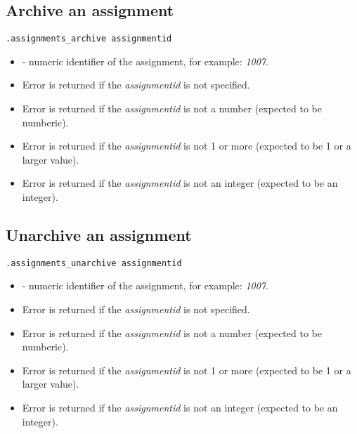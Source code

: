 \subsection{Archive an assignment}

\begin{lstlisting}[style=CommandLineStyle]
.assignments_archive assignmentid
\end{lstlisting}

\paramsheader
\begin{itemize}
    \item {} - numeric identifier of the assignment, for example: \textit{1007}.
\end{itemize}

\errheader
\begin{itemize}
    \item Error  is returned if the \textit{assignmentid} is not specified.
    \item Error  is returned if the \textit{assignmentid} is not a number (expected to be numberic).
    \item Error  is returned if the \textit{assignmentid} is not 1 or more (expected to be 1 or a larger value).
    \item Error  is returned if the \textit{assignmentid} is not an integer (expected to be an integer).
\end{itemize}



\subsection{Unarchive an assignment}

\begin{lstlisting}[style=CommandLineStyle]
.assignments_unarchive assignmentid
\end{lstlisting}

\paramsheader
\begin{itemize}
    \item {} - numeric identifier of the assignment, for example: \textit{1007}.
\end{itemize}

\errheader
\begin{itemize}
    \item Error  is returned if the \textit{assignmentid} is not specified.
    \item Error  is returned if the \textit{assignmentid} is not a number (expected to be numberic).
    \item Error  is returned if the \textit{assignmentid} is not 1 or more (expected to be 1 or a larger value).
    \item Error  is returned if the \textit{assignmentid} is not an integer (expected to be an integer).
\end{itemize}


